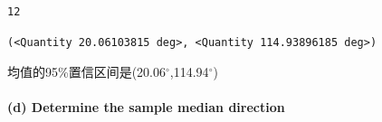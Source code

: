 \documentclass[11pt]{ctexart}
\makeatletter
\newcommand{\boxspacing}{\kern\kvtcb@left@rule\kern\kvtcb@boxsep}
\newcommand{\prompt}[4]{
        \ttfamily\llap{{\color{#2}[#3]:\hspace{3pt}#4}}\vspace{-\baselineskip}
    }
\makeatother
\begin{document}
\begin{tcolorbox}[breakable, size=fbox, boxrule=.5pt, pad at break*=1mm, opacityfill=0]
    \prompt{Out}{outcolor}{31}{\boxspacing}
    \begin{Verbatim}[commandchars=\\\{\}]
        12
    \end{Verbatim}
\end{tcolorbox}

\begin{tcolorbox}[breakable, size=fbox, boxrule=.5pt, pad at break*=1mm, opacityfill=0]
    \prompt{Out}{outcolor}{31}{\boxspacing}
    \begin{Verbatim}[commandchars=\\\{\}]
        (<Quantity 20.06103815 deg>, <Quantity 114.93896185 deg>)
    \end{Verbatim}
\end{tcolorbox}

均值的95\%置信区间是(20.06\(^\circ\),114.94\(^\circ\))

\hypertarget{d-determine-the-sample-median-direction}{%
    \paragraph{(d) Determine the sample median
        direction}\label{d-determine-the-sample-median-direction}}
\end{document}
